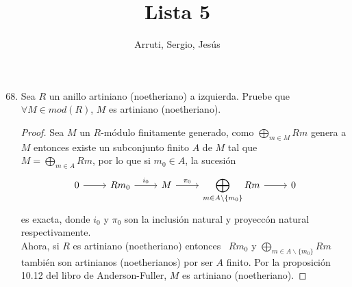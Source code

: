\documentclass{article}
\title{Lista 5}
\author{Arruti, Sergio, Jesús}
\date{}
\begin{document}
	\maketitle
	\begin{enumerate}[label=\textbf{Ej \arabic*.}]
		\setcounter{enumi}{67}
		\item
		Sea $R$ un anillo artiniano (noetheriano) a izquierda. Pruebe que \\ $\forall M\in mod(R)$, $M$ es artiniano (noetheriano).
		\begin{proof}
			Sea $M$ un $R$-módulo finitamente generado, como $\displaystyle\bigoplus_{m\in M}Rm$ genera a $M$ entonces existe un subconjunto finito 
			$A$ de $M$ tal que \\ $M=\displaystyle\bigoplus_{m\in A}Rm$, por lo que si $m_0\in A$, la sucesión \[
			\begin{tikzcd}
				0   \arrow{r}{}& R{m_0} \arrow{r}{i_0} & M\arrow{r}{\pi_0} &\arrow{r}{} \displaystyle\bigoplus_{m\in A\backslash \{m_0\}}Rm &0
			\end{tikzcd}
			\]
			es exacta, donde $i_0$ y $\pi_0$ son la inclusión natural y proyeccón natural respectivamente.\\
			Ahora, si $R$ es artiniano (noetheriano) entonces \,\,\,$R{m_0}$ y $ \displaystyle\bigoplus_{m\in A\backslash \{m_0\}}Rm$ \,\,\,también son 
			artinianos (noetherianos) por ser $A$ finito. Por la proposición 10.12 del libro de Anderson-Fuller, $M$ es artiniano (noetheriano).
		\end{proof}
		

\end{enumerate}
\end{document}

